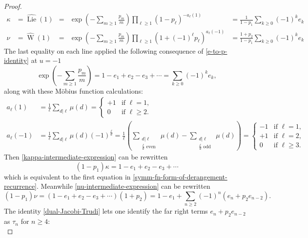 \documentclass[12pt]{amsart}
\theoremstyle{plain}
\theoremstyle{definition}
\begin{document}
\begin{proof}
\begin{align}
\label{kappa-intermediate-expression}
\kappa &= 
\widehat{{\operatorname{Lie}}}(1)
&=&
\exp\left( - \sum_{m \geq 1} \frac{p_m}{m} \right)
\prod_{\ell \geq 1} 
   \left( 
     1 - p_\ell 
   \right)^{-a_{\ell}(1)}
&=
  \frac{1}{1-p_1} \sum_{k \geq 0} (-1)^k e_k\\
\label{nu-intermediate-expression}
\nu
&=\widehat{{\operatorname{W}}}(1)
&=&
\exp\left( - \sum_{m \geq 1} \frac{p_m}{m} \right)
\prod_{\ell \geq 1} 
   \left( 
     1 + (-1)^\ell p_\ell 
   \right)^{a_{\ell}(-1)}
&=
  \frac{1 + p_2}{1-p_1} \sum_{k \geq 0} (-1)^k e_k
\end{align}
The last equality on each line applied
the following consequence of  \eqref{e-to-p-identity} at $u=-1$
$$
\exp \left( - \sum_{m \geq 1} \frac{p_m}{m} \right)
=1-e_1+e_2-e_3+\cdots=\sum_{k \geq 0} (-1)^k e_k,
$$
along with these M\"obius function calculations:
$$
\begin{aligned}
a_\ell(1)
&=\frac{1}{\ell} \sum_{d | \ell} \mu(d) 
= \begin{cases} 
+1 & \text{if }\ell=1,\\
0 &\text{if }\ell\geq 2. 
\end{cases}
\\
a_\ell(-1)
&=\frac{1}{\ell} \sum_{d | \ell} \mu(d) (-1)^{\frac{\ell}{d}}
=\frac{1}{\ell} \left( \sum_{\substack{d | \ell\\ \frac{\ell}{d}\text{ even }}} \mu(d) 
  -\sum_{\substack{d | \ell\\ \frac{\ell}{d}\text{ odd }}} \mu(d) \right) 
=\begin{cases}
-1&\text{if }\ell=1,\\
+1&\text{if }\ell=2,\\
0 &\text{if }\ell\geq 3.
\end{cases}
\end{aligned}
$$
Then \eqref{kappa-intermediate-expression} can be rewritten
$$
(1-p_1) \kappa =1-e_1+e_2-e_3+\cdots
$$
which is equivalent to the first equation 
in \eqref{symm-fn-form-of-derangement-recurrence}.
Meanwhile \eqref{nu-intermediate-expression} can be rewritten
\begin{equation}
\label{rewriting-of-nu-intermediate-expression}
(1-p_1) \nu 
=(1-e_1+e_2-e_3+\cdots) (1+p_2)
=1 - e_1 + \sum_{n \geq 2} (-1)^n (e_n + p_2 e_{n-2}).
\end{equation}
The identity \eqref{dual-Jacobi-Trudi} lets one identify
the far right terms $e_n + p_2 e_{n-2}$ as $\tau_n$ 
for $n \geq 4$:
\begin{equation}

\end{equation}
\end{proof}
\end{document}

